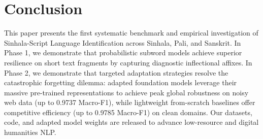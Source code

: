 \documentclass[11pt]{article}
\begin{document}
\section{Conclusion}
This paper presents the first systematic benchmark and empirical investigation of Sinhala-Script Language Identification across Sinhala, Pali, and Sanskrit. In Phase 1, we demonstrate that probabilistic subword models achieve superior resilience on short text fragments by capturing diagnostic inflectional affixes. In Phase 2, we demonstrate that targeted adaptation strategies resolve the catastrophic forgetting dilemma: adapted foundation models leverage their massive pre-trained representations to achieve peak global robustness on noisy web data (up to 0.9737 Macro-F1), while lightweight from-scratch baselines offer competitive efficiency (up to 0.9785 Macro-F1) on clean domains. Our datasets, code, and adapted model weights are released to advance low-resource and digital humanities NLP.
\end{document}
